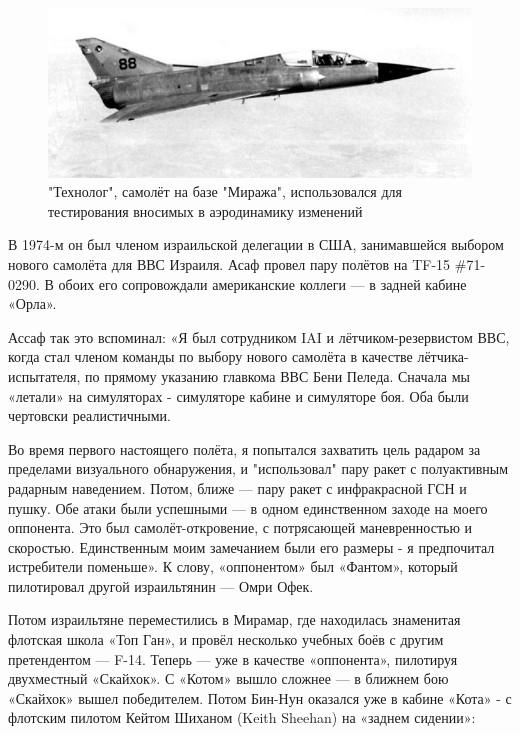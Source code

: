 \begin{figure}[h!tb] 
	\centering\includegraphics[scale=1.0]{History_BenNun/9TjHoDK-tYw.jpg}
	\caption{"Технолог", самолёт на базе "Миража", использовался для тестирования вносимых в аэродинамику изменений }%
\end{figure}

В 1974-м он был членом израильской делегации в США, занимавшейся выбором нового самолёта для ВВС Израиля. Асаф провел пару полётов на TF-15 \#71-0290. В обоих его сопровождали американские коллеги — в задней кабине «Орла».

Ассаф так это вспоминал: «Я был сотрудником IAI и лётчиком-резервистом ВВС, когда стал членом команды по выбору нового самолёта в качестве лётчика-испытателя, по прямому указанию главкома ВВС Бени Пеледа. Сначала мы «летали» на симуляторах - симуляторе кабине и симуляторе боя. Оба были чертовски реалистичными.

Во время первого настоящего полёта, я попытался захватить цель радаром за пределами визуального обнаружения, и "использовал" пару ракет с полуактивным радарным наведением. Потом, ближе — пару ракет с инфракрасной ГСН и пушку. Обе атаки были успешными — в одном единственном заходе на моего оппонента. Это был самолёт-откровение, с потрясающей маневренностью и скоростью. Единственным моим замечанием были его размеры - я предпочитал истребители поменьше». К слову, «оппонентом» был «Фантом», который пилотировал другой израильтянин — Омри Офек.

Потом израильтяне переместились в Мирамар, где находилась знаменитая флотская школа «Топ Ган», и провёл несколько учебных боёв с другим претендентом — F-14. Теперь — уже в качестве «оппонента», пилотируя двухместный «Скайхок». С «Котом» вышло сложнее — в ближнем бою «Скайхок» вышел победителем. Потом Бин-Нун оказался уже в кабине «Кота» - с флотским пилотом Кейтом Шиханом (Keith Sheehan) на «заднем сидении»:

